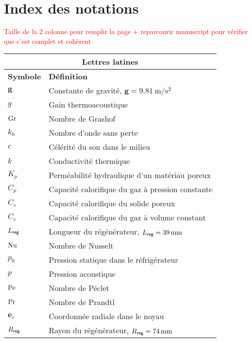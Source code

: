 \chapter{Index des notations}\label{chap:IndexNotations}%

\textcolor{red}{Taille de la 2\ieme{} colonne pour remplir la page + reparcourir manuscript pour vérifier que c'est complet et cohérent}

\begin{center}
    \begin{tabular}{p{} p{}}
        \multicolumn{2}{c}{Lettres latines}  \\\hline
        \textbf{Symbole} & \textbf{Définition} \\\hline\hline
        $\mathbf{g}$ & Constante de gravité, $\mathbf{g}=\qty{9.81}{\meter\per\second\squared}$ \\
        $g$ & Gain thermoacoustique \\
        $\mathrm{Gr}$ & Nombre de Grashof \\
        $k_0$ & Nombre d'onde sans perte \\
        $c$ & Célérité du son dans le milieu \\
        $k$ & Conductivité thermique \\
        $K_p$ & Perméabilité hydraulique d'un matériau poreux \\
        $C_p$ & Capacité calorifique du gaz à pression constante \\
        $C_s$ & Capacité calorifique du solide poreux \\
        $C_v$ & Capacité calorifique du gaz à volume constant \\
        $L_{\sf reg}$ & Longueur du régénérateur, $L_{\sf reg}=\qty{39}{\milli\meter}$ \\
        $\mathrm{Nu}$ & Nombre de Nusselt \\
        $p_0$ & Pression statique dans le réfrigérateur \\
        $p$ & Pression acoustique \\
        $\mathrm{Pe}$ & Nombre de Péclet \\
        $\mathrm{Pr}$ & Nombre de Prandtl \\
        $\mathbf{e}_r$ & Coordonnée radiale dans le noyau \\
        $R_{\sf reg}$ & Rayon du régénérateur, $R_{\sf reg}=\qty{74}{\milli\meter}$ \\

\end{tabular}
\end{center}
